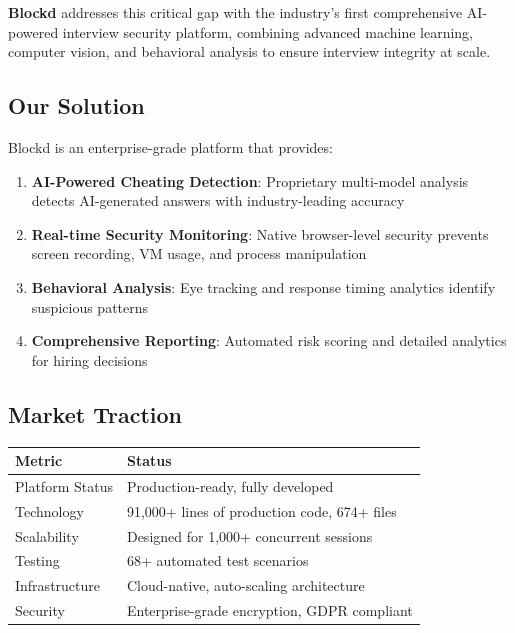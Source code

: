 \documentclass[11pt,letterpaper]{article}
\begin{document}
\textbf{Blockd} addresses this critical gap with the industry's first comprehensive AI-powered interview security platform, combining advanced machine learning, computer vision, and behavioral analysis to ensure interview integrity at scale.

\subsection{Our Solution}

Blockd is an enterprise-grade platform that provides:

\begin{enumerate}
    \item \textbf{AI-Powered Cheating Detection}: Proprietary multi-model analysis detects AI-generated answers with industry-leading accuracy
    \item \textbf{Real-time Security Monitoring}: Native browser-level security prevents screen recording, VM usage, and process manipulation
    \item \textbf{Behavioral Analysis}: Eye tracking and response timing analytics identify suspicious patterns
    \item \textbf{Comprehensive Reporting}: Automated risk scoring and detailed analytics for hiring decisions
\end{enumerate}

\subsection{Market Traction}

\begin{table}[H]
\centering
\begin{tabularx}{\textwidth}{lX}
\toprule
\textbf{Metric} & \textbf{Status} \\
\midrule
Platform Status & Production-ready, fully developed \\
Technology & 91,000+ lines of production code, 674+ files \\
Scalability & Designed for 1,000+ concurrent sessions \\
Testing & 68+ automated test scenarios \\
Infrastructure & Cloud-native, auto-scaling architecture \\
Security & Enterprise-grade encryption, GDPR compliant \\
\bottomrule
\end{tabularx}
\end{table}
\end{document}
